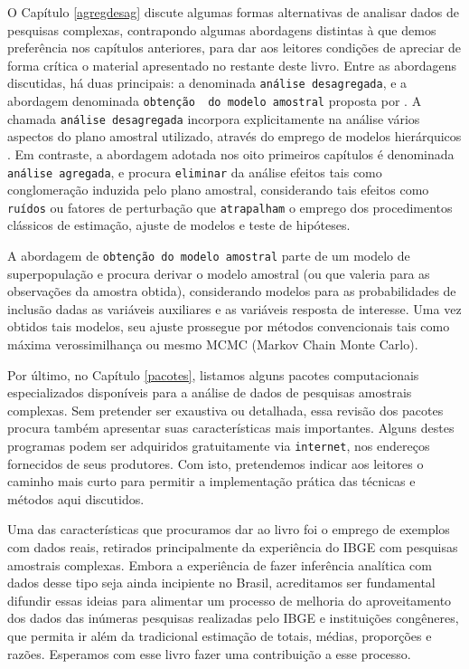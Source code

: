 \documentclass[]{book}
\theoremstyle{definition}
\theoremstyle{definition}
\theoremstyle{definition}
\theoremstyle{remark}
\begin{document}
O Capítulo \ref{agregdesag} discute algumas formas alternativas de
analisar dados de pesquisas complexas, contrapondo algumas abordagens
distintas à que demos preferência nos capítulos anteriores, para dar aos
leitores condições de apreciar de forma crítica o material apresentado
no restante deste livro. Entre as abordagens discutidas, há duas
principais: a denominada \texttt{análise\ desagregada}, e a abordagem
denominada \texttt{obtenção\ \ do\ modelo\ amostral} proposta por
\citep{PKR}. A chamada \texttt{análise\ desagregada} incorpora
explicitamente na análise vários aspectos do plano amostral utilizado,
através do emprego de modelos hierárquicos \citep{bryk}. Em contraste, a
abordagem adotada nos oito primeiros capítulos é denominada
\texttt{análise\ agregada}, e procura \texttt{eliminar} da análise
efeitos tais como conglomeração induzida pelo plano amostral,
considerando tais efeitos como \texttt{ruídos} ou fatores de perturbação
que \texttt{atrapalham} o emprego dos procedimentos clássicos de
estimação, ajuste de modelos e teste de hipóteses.

A abordagem de \texttt{obtenção\ do\ modelo\ amostral} parte de um
modelo de superpopulação e procura derivar o modelo amostral (ou que
valeria para as observações da amostra obtida), considerando modelos
para as probabilidades de inclusão dadas as variáveis auxiliares e as
variáveis resposta de interesse. Uma vez obtidos tais modelos, seu
ajuste prossegue por métodos convencionais tais como máxima
verossimilhança ou mesmo MCMC (Markov Chain Monte Carlo).

Por último, no Capítulo \ref{pacotes}, listamos alguns pacotes
computacionais especializados disponíveis para a análise de dados de
pesquisas amostrais complexas. Sem pretender ser exaustiva ou detalhada,
essa revisão dos pacotes procura também apresentar suas características
mais importantes. Alguns destes programas podem ser adquiridos
gratuitamente via \texttt{internet}, nos endereços fornecidos de seus
produtores. Com isto, pretendemos indicar aos leitores o caminho mais
curto para permitir a implementação prática das técnicas e métodos aqui
discutidos.

Uma das características que procuramos dar ao livro foi o emprego de
exemplos com dados reais, retirados principalmente da experiência do
IBGE com pesquisas amostrais complexas. Embora a experiência de fazer
inferência analítica com dados desse tipo seja ainda incipiente no
Brasil, acreditamos ser fundamental difundir essas ideias para alimentar
um processo de melhoria do aproveitamento dos dados das inúmeras
pesquisas realizadas pelo IBGE e instituições congêneres, que permita ir
além da tradicional estimação de totais, médias, proporções e razões.
Esperamos com esse livro fazer uma contribuição a esse processo.
\end{document}
